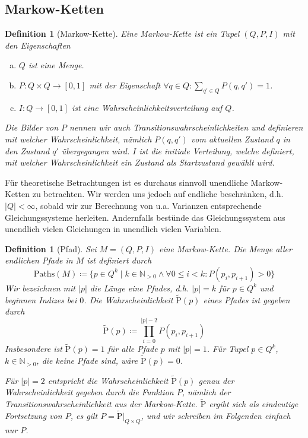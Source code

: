 \documentclass[a4paper]{article}
\newcommand{\mc}{Markow-Kette}
\newtheorem{definition}[satz]{Definition} %
\theoremstyle{nonumberplain}
\begin{document}
\subsection{\mc{}n}

\newcommand{\mcex}{$M = (Q, P, I)$}
\begin{definition}[\mc]\label{def-mc}
	Eine \mc{} ist ein Tupel $(Q, P, I)$ mit den Eigenschaften
	\begin{enumerate}[(a)]
		\item $Q$ ist eine Menge.
		\item $P : Q \times Q \to [0,1]$ mit der Eigenschaft $\forall q \in Q : \sum_{q' \in Q}{P(q,q') = 1}$.
		\item $I : Q \to [0,1]$ ist eine Wahrscheinlichkeitsverteilung auf $Q$.
	\end{enumerate}	
	Die Bilder von $P$ nennen wir auch Transitionswahrscheinlichkeiten und definieren mit welcher Wahrscheinlichkeit, nämlich $P(q,q')$ vom aktuellen Zustand $q$ in den Zustand $q'$ übergegangen wird. $I$ ist die initiale Verteilung, welche definiert, mit welcher Wahrscheinlichkeit ein Zustand als Startzustand gewählt wird.
\end{definition}

Für theoretische Betrachtungen ist es durchaus sinnvoll unendliche \mc{}n zu betrachten. Wir werden uns jedoch auf endliche beschränken, d.h. $|Q| < \infty$, sobald wir zur Berechnung von u.a. Varianzen entsprechende Gleichungssysteme herleiten. Andernfalls bestünde das Gleichungssystem aus unendlich vielen Gleichungen in unendlich vielen Variablen.

\newcommand{\gpath}{Pfad}
\newcommand{\pfin}{\mathrm{Paths}}%
\begin{definition}[\gpath]\label{def-path}
	Sei \mcex{} eine \mc{}. Die Menge aller endlichen \gpath e in $M$ ist definiert durch
	\begin{equation}
		\pfin(M) \coloneqq \{p \in Q^{k} \mid k \in \mathbb{N}_{>0} \land \forall 0 \leq i < k : P(p_i,p_{i+1}) > 0\}
	\end{equation}
	Wir bezeichnen mit $|p|$ die Länge eine Pfades, d.h. $|p| = k$ für $p \in Q^k$ und beginnen Indizes bei $0$.
	Die Wahrscheinlichkeit $\mathrm{\tilde{P}}(p)$ eines Pfades ist gegeben durch
	\begin{equation}
		\mathrm{\tilde{P}}(p) \coloneqq \prod_{i = 0}^{|p| - 2}{P(p_i,p_{i+1})}
	\end{equation}
	Insbesondere ist $\mathrm{\tilde{P}}(p) = 1$ für alle Pfade $p$ mit $|p| = 1$. Für Tupel $p \in Q^k$, $k \in \mathbb{N}_{>0}$, die keine Pfade sind, wäre $\mathrm{\tilde{P}}(p) = 0$.
	
	Für $|p| = 2$ entspricht die Wahrscheinlichkeit $\mathrm{\tilde{P}}(p)$ genau der Wahrscheinlichkeit gegeben durch die Funktion $P$, nämlich der Transitionswahrscheinlichkeit aus der \mc{}. $\mathrm{\tilde{P}}$ ergibt sich als eindeutige Fortsetzung von $P$, es gilt $P = \mathrm{\tilde{P}}\vert_{Q\times Q}$, und wir schreiben im Folgenden einfach nur $P$.
\end{definition}
\end{document}
